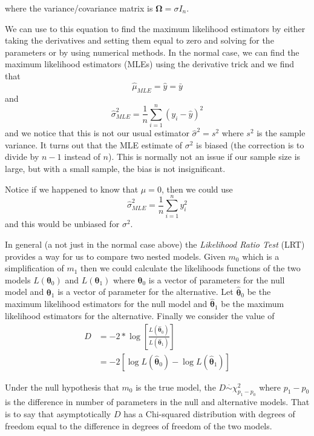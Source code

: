 \documentclass[]{book}
\theoremstyle{definition}
\theoremstyle{definition}
\theoremstyle{remark}
\begin{document}
where the variance/covariance matrix is
\(\boldsymbol{\Omega}=\sigma I_n\).

We can use to this equation to find the maximum likelihood estimators by
either taking the derivatives and setting them equal to zero and solving
for the parameters or by using numerical methods. In the normal case, we
can find the maximum likelihood estimators (MLEs) using the derivative
trick and we find that \[\hat{\mu}_{MLE}=\hat{y}=\bar{y}\] and
\[\hat{\sigma}_{MLE}^{2}=\frac{1}{n}\sum_{i=1}^{n}\left(y_{i}-\hat{y}\right)^{2}\]
and we notice that this is not our usual estimator
\(\hat{\sigma}^{2}=s^{2}\) where \(s^{2}\) is the sample variance. It
turns out that the MLE estimate of \(\sigma^{2}\) is biased (the
correction is to divide by \(n-1\) instead of \(n\)). This is normally
not an issue if our sample size is large, but with a small sample, the
bias is not insignificant.

Notice if we happened to know that \(\mu=0\), then we could use
\[\hat{\sigma}_{MLE}^{2}=\frac{1}{n}\sum_{i=1}^{n}y_{i}^{2}\] and this
would be unbiased for \(\sigma^{2}\).

In general (a not just in the normal case above) the \emph{Likelihood
Ratio Test} (LRT) provides a way for us to compare two nested models.
Given \(m_{0}\) which is a simplification of \(m_{1}\) then we could
calculate the likelihoods functions of the two models
\(L\left(\boldsymbol{\theta}_{0}\right)\) and
\(L\left(\boldsymbol{\theta}_{1}\right)\) where
\(\boldsymbol{\theta}_{0}\) is a vector of parameters for the null model
and \(\boldsymbol{\theta}_{1}\) is a vector of parameter for the
alternative. Let \(\hat{\boldsymbol{\theta}}_{0}\) be the maximum
likelihood estimators for the null model and
\(\hat{\boldsymbol{\theta}}_{1}\) be the maximum likelihood estimators
for the alternative. Finally we consider the value of \[\begin{aligned}
  D &=  -2*\log\left[\frac{L\left(\hat{\boldsymbol{\theta}}_{0}\right)}{L\left(\hat{\boldsymbol{\theta}}_{1}\right)}\right] \\
      &=    -2\left[\log L\left(\hat{\boldsymbol{\theta}}_{0}\right)-\log L\left(\hat{\boldsymbol{\theta}}_{1}\right)\right]
    \end{aligned}\]

Under the null hypothesis that \(m_{0}\) is the true model, the
\(D\stackrel{\cdot}{\sim}\chi_{p_{1}-p_{0}}^{2}\) where \(p_{1}-p_{0}\)
is the difference in number of parameters in the null and alternative
models. That is to say that asymptotically \(D\) has a Chi-squared
distribution with degrees of freedom equal to the difference in degrees
of freedom of the two models.
\end{document}
